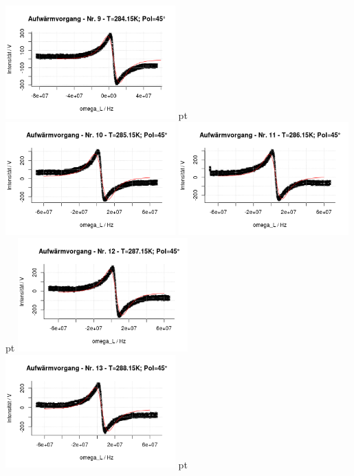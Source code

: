 \documentclass[12pt]{article}
\begin{document}
\begin{minipage}[h!]{\textwidth}
	{\centering
		
		\includegraphics[width=0.49\textwidth]{figures/warm45-9.png} pt
		\includegraphics[width=0.49\textwidth]{figures/warm45-10.png}\vskip -10pt
		\includegraphics[width=0.49\textwidth]{figures/warm45-11.png} pt
		\includegraphics[width=0.49\textwidth]{figures/warm45-12.png}\vskip -10pt	\includegraphics[width=0.49\textwidth]{figures/warm45-13.png} pt
}
\end{minipage}
\end{document}
